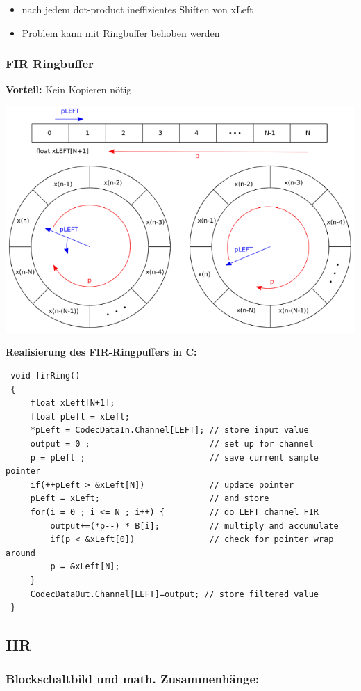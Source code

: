 \documentclass[10pt,a4paper]{article}
\begin{document}
\begin{itemize}
    \item nach jedem dot-product ineffizientes Shiften von xLeft
    \item Problem kann mit Ringbuffer behoben werden
\end{itemize}

\subsubsection{FIR Ringbuffer}
\textbf{Vorteil: } Kein Kopieren nötig
\begin{center}    
  \includegraphics[width=.5\textwidth]{./img/ring.png}  
\end{center}  


\textbf{Realisierung des FIR-Ringpuffers in C: }
\begin{verbatim}
 void firRing()
 {
     float xLeft[N+1];
     float pLeft = xLeft;
     *pLeft = CodecDataIn.Channel[LEFT]; // store input value
     output = 0 ;                        // set up for channel
     p = pLeft ;                         // save current sample pointer
     if(++pLeft > &xLeft[N])             // update pointer
     pLeft = xLeft;                      // and store
     for(i = 0 ; i <= N ; i++) {         // do LEFT channel FIR
         output+=(*p--) * B[i];          // multiply and accumulate
         if(p < &xLeft[0])               // check for pointer wrap around
         p = &xLeft[N];
     }
     CodecDataOut.Channel[LEFT]=output; // store filtered value
 }
 \end{verbatim}

\newpage 
\subsection{IIR}
\subsubsection{Blockschaltbild und math. Zusammenhänge:}
\end{document}
